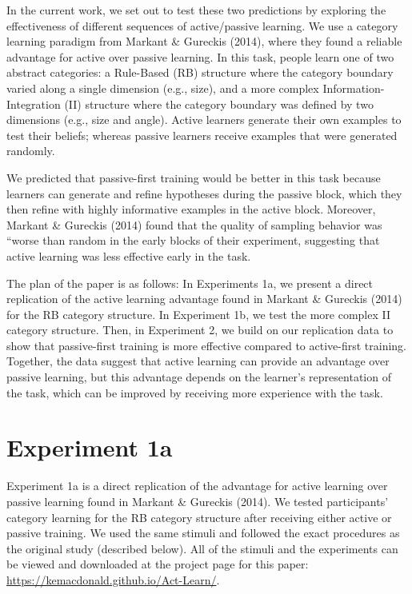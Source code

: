 \documentclass[10pt, letterpaper]{article}
\begin{document}
In the current work, we set out to test these two predictions by
exploring the effectiveness of different sequences of active/passive
learning. We use a category learning paradigm from Markant \& Gureckis
(2014), where they found a reliable advantage for active over passive
learning. In this task, people learn one of two abstract categories: a
Rule-Based (RB) structure where the category boundary varied along a
single dimension (e.g., size), and a more complex
Information-Integration (II) structure where the category boundary was
defined by two dimensions (e.g., size and angle). Active learners
generate their own examples to test their beliefs; whereas passive
learners receive examples that were generated randomly.

We predicted that passive-first training would be better in this task
because learners can generate and refine hypotheses during the passive
block, which they then refine with highly informative examples in the
active block. Moreover, Markant \& Gureckis (2014) found that the
quality of sampling behavior was ``worse than random in the early blocks
of their experiment, suggesting that active learning was less effective
early in the task.

The plan of the paper is as follows: In Experiments 1a, we present a
direct replication of the active learning advantage found in Markant \&
Gureckis (2014) for the RB category structure. In Experiment 1b, we test
the more complex II category structure. Then, in Experiment 2, we build
on our replication data to show that passive-first training is more
effective compared to active-first training. Together, the data suggest
that active learning can provide an advantage over passive learning, but
this advantage depends on the learner's representation of the task,
which can be improved by receiving more experience with the task.

\section{Experiment 1a}\label{experiment-1a}

Experiment 1a is a direct replication of the advantage for active
learning over passive learning found in Markant \& Gureckis (2014). We
tested participants' category learning for the RB category structure
after receiving either active or passive training. We used the same
stimuli and followed the exact procedures as the original study
(described below). All of the stimuli and the experiments can be viewed
and downloaded at the project page for this paper:
\url{https://kemacdonald.github.io/Act-Learn/}.
\end{document}
